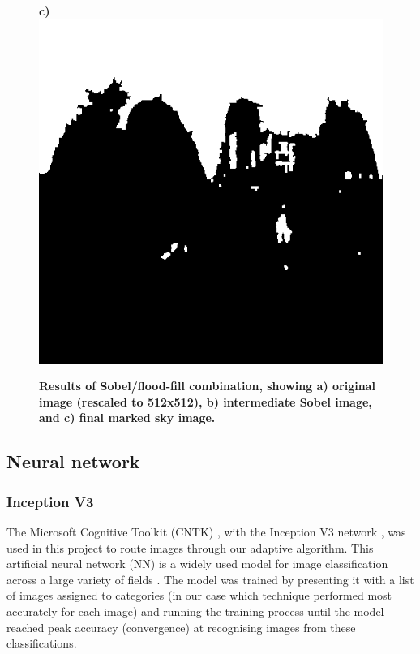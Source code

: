 \documentclass[final,3p,times,authoryear]{elsarticle}
\begin{document}
\begin{figure}
\textbf{c)}\includegraphics[scale=0.27]{Images/2/FloodfillOutput.png}
\caption{\bf   Results of Sobel/flood-fill combination, showing a) original image (rescaled to 512x512), b) intermediate Sobel image, and c) final marked sky image.}    
 \label{fig:sobelflood}  
\end{figure} 

\subsection{Neural network}\label{sec:nn}

\subsubsection{Inception V3}\label{sec:inception}
The Microsoft Cognitive Toolkit (CNTK) \citep{Yu2015,Agarwal2016}, with the Inception V3 network \citep{Szegedy2015a}, was used in this project to route images through our adaptive algorithm. This artificial neural network (NN) is a widely used model for image classification across a large variety of fields \citep{Xia2017,Hassannejad2016}. The model was trained by presenting it with a list of images assigned to categories (in our case which technique performed most accurately for each image) and running the training process until the model reached peak accuracy (convergence) at recognising images from these classifications.
\end{document}
